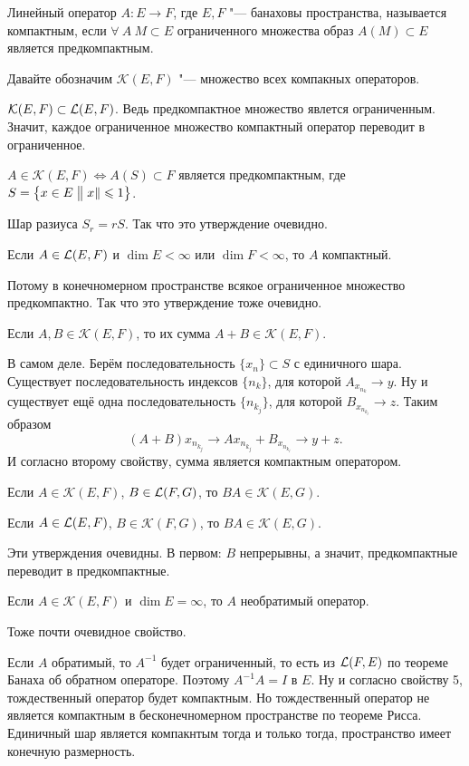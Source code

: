 \begin{Def}
  Линейный оператор $A\colon E\to F$, где $E,F$ "--- банаховы пространства, называется компактным, если $\forall\ A\ M\subset E$ ограниченного множества образ $A(M)\subset E$ является предкомпактным. 
\end{Def}
Давайте обозначим $\mathcal K(E,F)$ "--- множество всех компакных операторов.

\begin{Ut}
  $\mathcal K(E,F)\subset \L(E,F)$. Ведь предкомпактное множество явлется ограниченным. Значит, каждое ограниченное множество компактный оператор переводит в ограниченное.
\end{Ut}

\begin{Ut}
  $A\in\mathcal K(E,F)\iff A(S)\subset F$ является предкомпактным, где $S = \big\{x\in E\bigm\|x\|\le1\big\}$.
\end{Ut}
Шар разиуса $S_r = r S$. Так что это утверждение очевидно.
\begin{Ut}
Если $A\in\L(E,F)$ и $\dim E<\infty$ или $\dim F<\infty$, то $A$ компактный.
\end{Ut}
Потому в конечномерном пространстве всякое ограниченное множество предкомпактно. Так что это утверждение тоже очевидно.

\begin{Ut}
  Если $A,B\in\mathcal K(E,F)$, то их сумма $A+B\in\mathcal K(E,F)$. 
\end{Ut}
\begin{Proof}
В самом деле. Берём последовательность $\{x_n\}\subset S$ с единичного шара. Существует последовательность индексов $\{n_k\}$, для которой $A_{x_{n_k}} \to y$. Ну и существует ещё одна последовательность $\{n_{k_j}\}$, для которой $B_{x_{n_{k_j}}}\to z$. Таким образом
\[
  (A+B)x_{n_{k_j}}\to A x_{n_{k_j}} + B_{x_{n_{k_j}}}\to y + z.
\]
И согласно второму свойству, сумма является компактным оператором.
\end{Proof}

\begin{Ut}
  Если $A\in\mathcal K(E,F)$, $B\in\L(F,G)$, то $BA\in\mathcal K(E,G)$.
\end{Ut}
\begin{Ut}
  Если $A\in\L(E,F)$, $B\in\mathcal K(F,G)$, то $BA\in\mathcal K(E,G)$.
\end{Ut}
Эти утверждения очевидны. В первом: $B$ непрерывны, а значит, предкомпактные переводит в предкомпактные.

\begin{Ut}
  Если $A\in\mathcal K(E,F)$ и $\dim E = \infty$, то $A$ необратимый оператор.
\end{Ut}
Тоже почти очевидное свойство.
\begin{Proof}
Если $A$ обратимый, то $A^{-1}$ будет ограниченный, то есть из $\L(F,E)$ по теореме Банаха об обратном операторе. Поэтому $A^{-1}A = I$ в $E$. Ну и согласно свойству 5, тождественный оператор будет компактным. Но тождественный оператор не является компактным в бесконечномерном пространстве по теореме Рисса. Единичный шар является компакнтым тогда и только тогда, пространство имеет конечную размерность.
\end{Proof}


